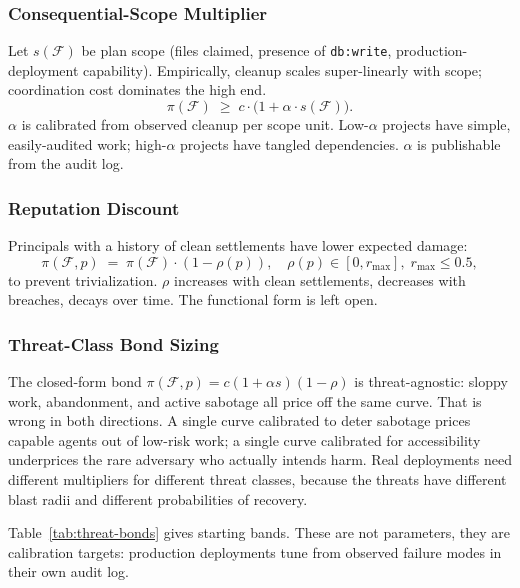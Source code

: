\documentclass[11pt,a4paper]{article}
\theoremstyle{definition}
\theoremstyle{remark}
\begin{document}
\subsubsection{Consequential-Scope Multiplier}\label{sec:scope-multiplier}

Let $s(\mathcal{F})$ be plan scope (files claimed, presence of \texttt{db:write}, production-deployment capability). Empirically, cleanup scales super-linearly with scope; coordination cost dominates the high end.
\[
\pi(\mathcal{F}) \;\geq\; c \cdot \bigl(1 + \alpha \cdot s(\mathcal{F})\bigr).
\]
$\alpha$ is calibrated from observed cleanup per scope unit. Low-$\alpha$ projects have simple, easily-audited work; high-$\alpha$ projects have tangled dependencies. $\alpha$ is publishable from the audit log.

\subsubsection{Reputation Discount}\label{sec:rep-discount}

Principals with a history of clean settlements have lower expected damage:
\[
\pi(\mathcal{F}, p) \;=\; \pi(\mathcal{F}) \cdot (1 - \rho(p)),
\quad \rho(p) \in [0, r_{\max}],\; r_{\max} \leq 0.5,
\]
to prevent trivialization. $\rho$ increases with clean settlements, decreases with breaches, decays over time. The functional form is left open.

\subsubsection{Threat-Class Bond Sizing}\label{sec:pricing:threats}

The closed-form bond $\pi(\mathcal{F}, p) = c(1 + \alpha s)(1 - \rho)$ is threat-agnostic: sloppy work, abandonment, and active sabotage all price off the same curve. That is wrong in both directions. A single curve calibrated to deter sabotage prices capable agents out of low-risk work; a single curve calibrated for accessibility underprices the rare adversary who actually intends harm. Real deployments need different multipliers for different threat classes, because the threats have different blast radii and different probabilities of recovery.

Table~\ref{tab:threat-bonds} gives starting bands. These are not parameters, they are calibration targets: production deployments tune from observed failure modes in their own audit log.
\end{document}
